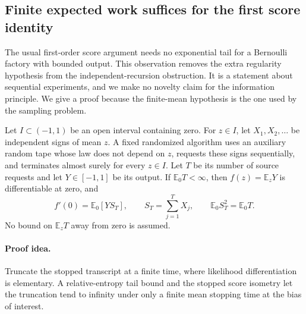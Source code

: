 \subsection{Finite expected work suffices for the first score identity}
\label{sec:new-finite-score}

The usual first-order score argument needs no exponential tail for a
Bernoulli factory with bounded output.  This observation removes the
extra regularity hypothesis from the independent-recursion obstruction.
It is a statement about sequential experiments, and we make no novelty
claim for the information principle.  We give a proof because the
finite-mean hypothesis is the one used by the sampling problem.

\begin{lemma}
\label{lem:new-finite-score}
Let $I\subset(-1,1)$ be an open interval containing zero.  For $z\in I$, let
$X_1,X_2,\ldots$ be independent signs of mean $z$.  A fixed randomized
algorithm uses an auxiliary random tape whose law does not depend on
$z$, requests these signs sequentially, and terminates almost surely
for every $z\in I$.  Let $T$ be its number of source requests and let
$Y\in[-1,1]$ be its output.  If $\mathbb E_0T<\infty$, then
$f(z)=\mathbb E_zY$ is differentiable at zero, and
\[
 f'(0)=\mathbb E_0[YS_T],\qquad
 S_T=\sum_{j=1}^T X_j,\qquad
 \mathbb E_0 S_T^2=\mathbb E_0T.
\]
No bound on $\mathbb E_zT$ away from zero is assumed.
\end{lemma}
\paragraph{Proof idea.}
Truncate the stopped transcript at a finite time, where likelihood
differentiation is elementary. A relative-entropy tail bound and the stopped
score isometry let the truncation tend to infinity under only a finite mean
stopping time at the bias of interest.

